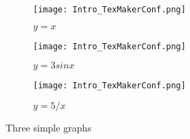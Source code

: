\begin{figure}[h]
    \centering
    \begin{subfigure}[b]{.3\textwidth}
        \centering
        \texttt{[image: Intro\_TexMakerConf.png]}
        \caption{$y=x$}
        \label{fig:triple_x}
    \end{subfigure}
    \hfill
    \begin{subfigure}[b]{0.3\textwidth}
        \centering
        \texttt{[image: Intro\_TexMakerConf.png]}
        \caption{$y=3sinx$}
        \label{fig:triple_3sinx}
    \end{subfigure}
    \hfill
    \begin{subfigure}[b]{0.3\textwidth}
        \centering
        \texttt{[image: Intro\_TexMakerConf.png]}
        \caption{$y=5/x$}
        \label{fig:triple_5overx}
    \end{subfigure}
    \caption[Resume line]{Three simple graphs}
    \label{fig:triple}
\end{figure}
